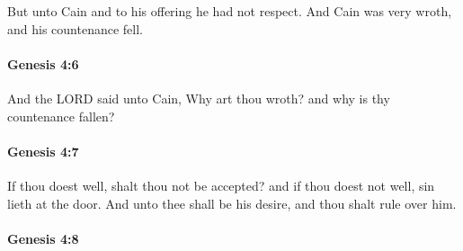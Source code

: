 			But unto Cain and to his offering he had not respect.  And Cain was very wroth, and his countenance fell.


		\paragraph{Genesis 4:6} %
			\label{GENESIS-4-6}

			And the LORD said unto Cain, Why art thou wroth?  and why is thy countenance fallen?


		\paragraph{Genesis 4:7} %
			\label{GENESIS-4-7}

			If thou doest well, shalt thou not be accepted?  and if thou doest not well, sin lieth at the door.  And unto thee shall be his desire, and thou shalt rule over him.


		\paragraph{Genesis 4:8} %
			\label{GENESIS-4-8}


